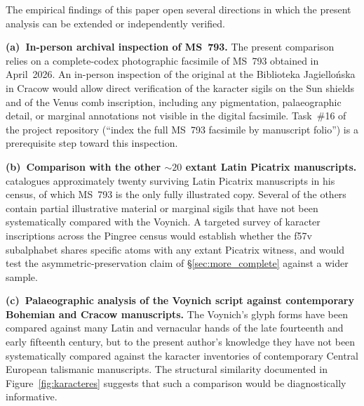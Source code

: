 The empirical findings of this paper open several directions in which
the present analysis can be extended or independently verified.

\noindent\textbf{(a)~In-person archival inspection of MS~793.} The
present comparison relies on a complete-codex photographic facsimile
of MS~793 obtained in April~2026. An in-person inspection of the
original at the Biblioteka Jagiello\'nska in Cracow would allow direct
verification of the karacter sigils on the Sun shields and of the
Venus comb inscription, including any pigmentation, palaeographic
detail, or marginal annotations not visible in the digital facsimile.
Task~\#16 of the project repository (``index the full MS~793 facsimile
by manuscript folio'') is a prerequisite step toward this inspection.

\noindent\textbf{(b)~Comparison with the other ${\sim}20$ extant Latin
Picatrix manuscripts.} \citet{pingree1986} catalogues approximately
twenty surviving Latin Picatrix manuscripts in his census, of which
MS~793 is the only fully illustrated copy. Several of the others
contain partial illustrative material or marginal sigils that have not
been systematically compared with the Voynich. A targeted survey of
karacter inscriptions across the Pingree census would establish
whether the f57v subalphabet shares specific atoms with any extant
Picatrix witness, and would test the asymmetric-preservation claim of
\S\ref{sec:more_complete} against a wider sample.

\noindent\textbf{(c)~Palaeographic analysis of the Voynich script
against contemporary Bohemian and Cracow manuscripts.} The Voynich's
glyph forms have been compared against many Latin and vernacular
hands of the late fourteenth and early fifteenth century, but to the
present author's knowledge they have not been systematically compared
against the karacter inventories of contemporary Central European
talismanic manuscripts. The structural similarity documented in
Figure~\ref{fig:karacteres} suggests that such a comparison would be
diagnostically informative.


